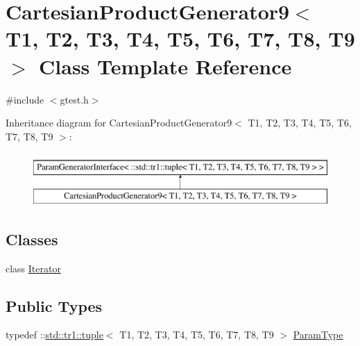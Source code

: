 \hypertarget{classtesting_1_1internal_1_1CartesianProductGenerator9}{\section{\-Cartesian\-Product\-Generator9$<$ \-T1, \-T2, \-T3, \-T4, \-T5, \-T6, \-T7, \-T8, \-T9 $>$ \-Class \-Template \-Reference}
\label{de/ddb/classtesting_1_1internal_1_1CartesianProductGenerator9}
}


{\ttfamily \#include $<$gtest.\-h$>$}

\-Inheritance diagram for \-Cartesian\-Product\-Generator9$<$ \-T1, \-T2, \-T3, \-T4, \-T5, \-T6, \-T7, \-T8, \-T9 $>$\-:\begin{figure}[H]
\begin{center}
\leavevmode
\includegraphics[height=2.000000cm]{de/ddb/classtesting_1_1internal_1_1CartesianProductGenerator9}
\end{center}
\end{figure}
\subsection*{\-Classes}
\begin{DoxyCompactItemize}
\item 
class \hyperlink{classtesting_1_1internal_1_1CartesianProductGenerator9_1_1Iterator}{\-Iterator}
\end{DoxyCompactItemize}
\subsection*{\-Public \-Types}
\begin{DoxyCompactItemize}
\item 
typedef \-::\hyperlink{classstd_1_1tr1_1_1tuple}{std\-::tr1\-::tuple}$<$ \-T1, \*
\-T2, \-T3, \-T4, \-T5, \-T6, \-T7, \-T8, \-T9 $>$ \hyperlink{classtesting_1_1internal_1_1CartesianProductGenerator9_a311b2d1d5a489d4841f258a70f33bf9d}{\-Param\-Type}
\end{DoxyCompactItemize}
